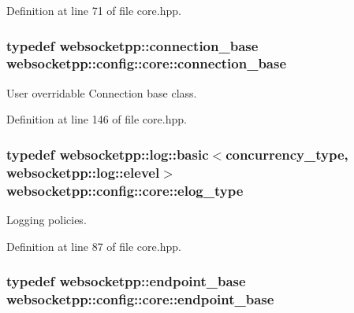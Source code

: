 Definition at line 71 of file core.\+hpp.

\hypertarget{structwebsocketpp_1_1config_1_1core_a8e35ea7d03ba80347094fd53e1cac178}{}
\subsubsection[{connection\+\_\+base}]{\setlength{\rightskip}{0pt plus 5cm}typedef {\bf websocketpp\+::connection\+\_\+base} {\bf websocketpp\+::config\+::core\+::connection\+\_\+base}}\label{structwebsocketpp_1_1config_1_1core_a8e35ea7d03ba80347094fd53e1cac178}


User overridable Connection base class. 



Definition at line 146 of file core.\+hpp.

\hypertarget{structwebsocketpp_1_1config_1_1core_ac037ffb73b675a6251f3b86433b4eb17}{}
\subsubsection[{elog\+\_\+type}]{\setlength{\rightskip}{0pt plus 5cm}typedef {\bf websocketpp\+::log\+::basic}$<${\bf concurrency\+\_\+type}, {\bf websocketpp\+::log\+::elevel}$>$ {\bf websocketpp\+::config\+::core\+::elog\+\_\+type}}\label{structwebsocketpp_1_1config_1_1core_ac037ffb73b675a6251f3b86433b4eb17}


Logging policies. 



Definition at line 87 of file core.\+hpp.

\hypertarget{structwebsocketpp_1_1config_1_1core_a5389422816ef3115fb8b7f4cd92d5ca3}{}
\subsubsection[{endpoint\+\_\+base}]{\setlength{\rightskip}{0pt plus 5cm}typedef {\bf websocketpp\+::endpoint\+\_\+base} {\bf websocketpp\+::config\+::core\+::endpoint\+\_\+base}}\label{structwebsocketpp_1_1config_1_1core_a5389422816ef3115fb8b7f4cd92d5ca3}


